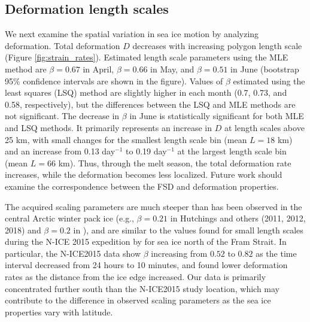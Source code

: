 \documentclass[review, jog]{igs}
\begin{document}
\subsection{Deformation length scales}
We next examine the spatial variation in sea ice motion by analyzing deformation.
Total deformation $D$ decreases with increasing polygon length scale (Figure \ref{fig:strain_rates}).
Estimated length scale parameters using the MLE method are $\beta=0.67$ in April, $\beta=0.66$ in May, and $\beta=0.51$ in June (bootstrap 95\% confidence intervals are shown in the figure). Values of $\beta$ estimated using the least squares (LSQ) method are slightly higher in each month (0.7, 0.73, and 0.58, respectively), but the differences between the LSQ and MLE methods are not significant.
The decrease in $\beta$ in June is statistically significant for both MLE and LSQ methods. 
It primarily represents an increase in $D$ at length scales above 25 km, with small changes for the smallest length scale bin (mean $L = 18$ km) and an increase from 0.13 day$^{-1}$ to 0.19 day$^{-1}$ at the largest length scale bin (mean $L = 66$ km). Thus, through the melt season, the total deformation rate increases, while the deformation becomes less localized. 
Future work should examine the correspondence between the FSD and deformation properties.

The acquired scaling parameters are much steeper than has been observed in the central Arctic winter pack ice (e.g., $\beta=0.21$ in Hutchings and others (2011, 2012, 2018) and $\beta=0.2$ in \cite{Marsan2004}), and are similar to the values found for small length scales during the N-ICE 2015 expedition by \cite{oikkonen2017_SmallScale} for sea ice north of the Fram Strait.
In particular, the N-ICE2015 data show $\beta$ increasing from $0.52$ to $0.82$ as the time interval decreased from 24 hours to 10 minutes, and found lower deformation rates as the distance from the ice edge increased.
Our data is primarily concentrated further south than the N-ICE2015 study location, which may contribute to the difference in observed scaling parameters as the sea ice properties vary with latitude.
\end{document}
